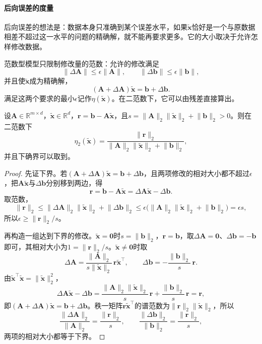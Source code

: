 \paragraph{后向误差的度量}
后向误差的想法是：数据本身只准确到某个误差水平，如果$\tilde{\bm x}$恰好是一个与原数据相差不超过这一水平的问题的精确解，就不能再要求更多。它的大小取决于允许怎样修改数据。

范数型模型只限制修改量的范数：允许的修改满足
\begin{equation}
 \lVert\Delta\bm A\rVert\leq\epsilon\lVert\bm A\rVert,\qquad \lVert\Delta\bm b\rVert\leq\epsilon\lVert\bm b\rVert,
 \label{eq:ls-normwise-backward-model}
\end{equation}
并且使$\tilde{\bm x}$成为精确解，
\begin{equation}
 (\bm A+\Delta\bm A)\tilde{\bm x}=\bm b+\Delta\bm b .
 \label{eq:ls-backward-exact-condition}
\end{equation}
满足这两个要求的最小$\epsilon$记作$\eta(\tilde{\bm x})$。在二范数下，它可以由残差直接算出。

\begin{theorem}[范数型后向误差]
\label{thm:ls-backward-error-formulas}
设$\bm A\in\mathbb R^{m\times d}$，$\tilde{\bm x}\in\mathbb R^d$，$\bm r=\bm b-\bm A\tilde{\bm x}$，且$s=\lVert\bm A\rVert_2\lVert\tilde{\bm x}\rVert_2+\lVert\bm b\rVert_2>0$。则在二范数下
\begin{equation}
 \eta_2(\tilde{\bm x})=\frac{\lVert\bm r\rVert_2}{\lVert\bm A\rVert_2\lVert\tilde{\bm x}\rVert_2+\lVert\bm b\rVert_2},
 \label{eq:ls-normwise-backward-error}
\end{equation}
并且下确界可以取到。
\end{theorem}
\begin{proof}
先证下界。若$(\bm A+\Delta\bm A)\tilde{\bm x}=\bm b+\Delta\bm b$，且两项修改的相对大小都不超过$\epsilon$，把$\bm A\tilde{\bm x}$与$\Delta\bm b$分别移到两边，得
\[
 \bm r=\bm b-\bm A\tilde{\bm x}=\Delta\bm A\tilde{\bm x}-\Delta\bm b .
\]
取范数，
\[
 \lVert\bm r\rVert_2\leq\lVert\Delta\bm A\rVert_2\lVert\tilde{\bm x}\rVert_2+\lVert\Delta\bm b\rVert_2
 \leq\epsilon\bigl(\lVert\bm A\rVert_2\lVert\tilde{\bm x}\rVert_2+\lVert\bm b\rVert_2\bigr)=\epsilon s,
\]
所以$\epsilon\geq\lVert\bm r\rVert_2/s$。

再构造一组达到下界的修改。$\tilde{\bm x}=\bm0$时$s=\lVert\bm b\rVert_2$，$\bm r=\bm b$，取$\Delta\bm A=\bm0$、$\Delta\bm b=-\bm b$即可，其相对大小为$1=\lVert\bm r\rVert_2/s$。$\tilde{\bm x}\ne\bm0$时取
\[
 \Delta\bm A=\frac{\lVert\bm A\rVert_2}{s\lVert\tilde{\bm x}\rVert_2}\,\bm r\tilde{\bm x}^\top,\qquad
 \Delta\bm b=-\frac{\lVert\bm b\rVert_2}{s}\,\bm r .
\]
由$\tilde{\bm x}^\top\tilde{\bm x}=\lVert\tilde{\bm x}\rVert_2^2$，
\[
 \Delta\bm A\tilde{\bm x}-\Delta\bm b=\frac{\lVert\bm A\rVert_2\lVert\tilde{\bm x}\rVert_2}{s}\,\bm r+\frac{\lVert\bm b\rVert_2}{s}\,\bm r=\bm r,
\]
即$(\bm A+\Delta\bm A)\tilde{\bm x}=\bm b+\Delta\bm b$。秩一矩阵$\bm r\tilde{\bm x}^\top$的谱范数为$\lVert\bm r\rVert_2\lVert\tilde{\bm x}\rVert_2$，所以
\[
 \frac{\lVert\Delta\bm A\rVert_2}{\lVert\bm A\rVert_2}=\frac{\lVert\bm r\rVert_2}{s},\qquad
 \frac{\lVert\Delta\bm b\rVert_2}{\lVert\bm b\rVert_2}=\frac{\lVert\bm r\rVert_2}{s},
\]
两项的相对大小都等于下界。
\end{proof}


